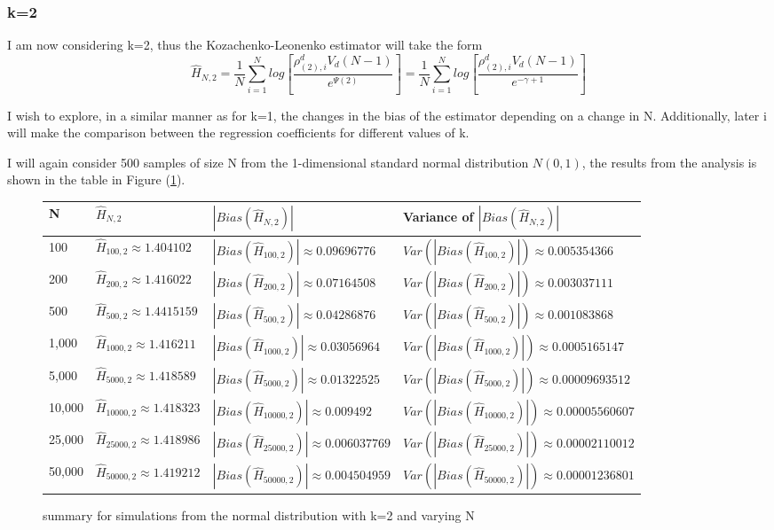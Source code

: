 \documentclass{article}
\begin{document}
\subsubsection{k=2}
I am now considering k=2, thus the Kozachenko-Leonenko estimator will take the form
\begin{equation}
\hat{H}_{N, 2} = \frac{1}{N} \sum_{i=1}^{N} log \left[ \frac{\rho_{(2),i}^{d} V_{d} (N-1)}{e^{\Psi(2)}} \right] = \frac{1}{N} \sum_{i=1}^{N} log \left[ \frac{\rho_{(2),i}^{d} V_{d} (N-1)}{e^{-\gamma + 1}} \right]
\end{equation}

I wish to explore, in a similar manner as for k=1, the changes in the bias of the estimator depending on a change in N. Additionally, later i will make the comparison between the regression coefficients for different values of k.

I will again consider 500 samples of size N from the 1-dimensional standard normal distribution $N(0, 1)$, the results from the analysis is shown in the table in Figure (\ref{fig:normal_k=2}).

\begin{figure} 
 \begin{adjustwidth}{-2cm}{}
\begin{tabular}{|l|l|l|l|}
\hline
N & $\hat{H}_{N, 2}$ & $|Bias(\hat{H}_{N, 2})|$ & Variance of $|Bias(\hat{H}_{N, 2})|$ \\
\hline
100 & $\hat{H}_{100, 2} \approx 1.404102$ & $|Bias(\hat{H}_{100, 2})| \approx 0.09696776$ & $Var(|Bias(\hat{H}_{100, 2})|) \approx 0.005354366$\\
200 & $\hat{H}_{200, 2} \approx 1.416022$ & $|Bias(\hat{H}_{200, 2})| \approx 0.07164508$ & $Var(|Bias(\hat{H}_{200, 2})|) \approx 0.003037111$\\
500 & $\hat{H}_{500, 2} \approx 1.4415159$ & $|Bias(\hat{H}_{500, 2})| \approx 0.04286876$ & $Var(|Bias(\hat{H}_{500, 2})|) \approx 0.001083868$\\
1,000 & $\hat{H}_{1000, 2} \approx 1.416211$ & $|Bias(\hat{H}_{1000, 2})| \approx 0.03056964$ & $Var(|Bias(\hat{H}_{1000, 2})|) \approx 0.0005165147$\\
5,000 & $\hat{H}_{5000, 2} \approx 1.418589$ & $|Bias(\hat{H}_{5000, 2})| \approx 0.01322525$ & $Var(|Bias(\hat{H}_{5000, 2})|) \approx 0.00009693512$\\
10,000 & $\hat{H}_{10000, 2} \approx 1.418323$ & $|Bias(\hat{H}_{10000, 2})| \approx 0.009492$ & $Var(|Bias(\hat{H}_{10000, 2})|) \approx 0.00005560607$\\
25,000 & $\hat{H}_{25000, 2} \approx 1.418986$ & $|Bias(\hat{H}_{25000, 2})| \approx 0.006037769$ & $Var(|Bias(\hat{H}_{25000, 2})|) \approx 0.00002110012$\\
50,000 & $\hat{H}_{50000, 2} \approx 1.419212$ & $|Bias(\hat{H}_{50000, 2})| \approx 0.004504959$ & $Var(|Bias(\hat{H}_{50000, 2})|) \approx 0.00001236801$\\
\hline
\end{tabular}
\caption{\label{fig:normal_k=2} summary for simulations from the normal distribution with k=2 and varying N}
 \end{adjustwidth}
\end{figure}
\end{document}
